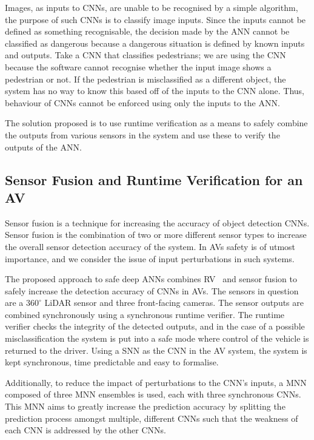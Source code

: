 Images, as inputs to \acfp{CNN}, are unable to be recognised by a simple algorithm, the purpose of such \acp{CNN} is to classify image inputs.
Since the inputs cannot be defined as something recognisable, the decision made by the \ac{ANN} cannot be classified as dangerous because a dangerous situation is defined by known inputs and outputs.
Take a \ac{CNN} that classifies pedestrians; we are using the \ac{CNN} because the software cannot recognise whether the input image shows a pedestrian or not.
If the pedestrian is misclassified as a different object, the system has no way to know this based off of the inputs to the \ac{CNN} alone.
Thus, behaviour of \acp{CNN} cannot be enforced using only the inputs to the \ac{ANN}.

The solution proposed is to use runtime verification as a means to safely combine the outputs from various sensors in the system and use these to verify the outputs of the \ac{ANN}.

\subsection{Sensor Fusion and Runtime Verification for an \acf{AV}~\cite{SensorFusion2017}}
Sensor fusion is a technique for increasing the accuracy of object detection \acp{CNN}. 
Sensor fusion is the combination of two or more different sensor types to increase the overall sensor detection accuracy of the system.
In \acfp{AV} safety is of utmost importance, and we consider the issue of input perturbations in such systems.

The proposed approach to safe deep \acp{ANN} combines \acf{RV}~\cite{runtime-verify} and sensor fusion to safely increase the detection accuracy of \acp{CNN} in \acp{AV}.
The sensors in question are a $360^\circ$ \ac{LiDAR} sensor and three front-facing cameras.
The sensor outputs are combined synchronously using a synchronous runtime verifier.
The runtime verifier checks the integrity of the detected outputs, and in the case of a possible misclassification the system is put into a safe mode where control of the vehicle is returned to the driver.
Using a \acf{SNN} as the \ac{CNN} in the \ac{AV} system, the system is kept synchronous, time predictable and easy to formalise.

Additionally, to reduce the impact of perturbations to the \ac{CNN}'s inputs, a \ac{MNN} composed of three \ac{MNN} ensembles is used, each with three synchronous \acp{CNN}.
This \ac{MNN} aims to greatly increase the prediction accuracy by splitting the prediction process amongst multiple, different \acp{CNN} such that the weakness of each \ac{CNN} is addressed by the other \acp{CNN}.

